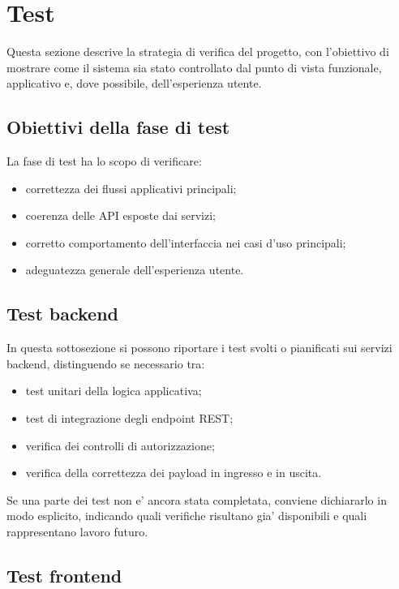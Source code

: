 \section{Test}

Questa sezione descrive la strategia di verifica del progetto, con l'obiettivo di mostrare come il sistema sia stato controllato dal punto di vista funzionale, applicativo e, dove possibile, dell'esperienza utente.

\subsection{Obiettivi della fase di test}

La fase di test ha lo scopo di verificare:

\begin{itemize}
	\item correttezza dei flussi applicativi principali;
	\item coerenza delle API esposte dai servizi;
	\item corretto comportamento dell'interfaccia nei casi d'uso principali;
	\item adeguatezza generale dell'esperienza utente.
\end{itemize}

\subsection{Test backend}

In questa sottosezione si possono riportare i test svolti o pianificati sui servizi backend, distinguendo se necessario tra:

\begin{itemize}
	\item test unitari della logica applicativa;
	\item test di integrazione degli endpoint REST;
	\item verifica dei controlli di autorizzazione;
	\item verifica della correttezza dei payload in ingresso e in uscita.
\end{itemize}

Se una parte dei test non e' ancora stata completata, conviene dichiararlo in modo esplicito, indicando quali verifiche risultano gia' disponibili e quali rappresentano lavoro futuro.

\subsection{Test frontend}

